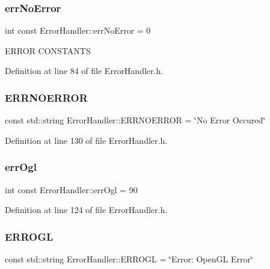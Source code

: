 \subsubsection{\texorpdfstring{errNoError}{errNoError}}
{\footnotesize\ttfamily int const Error\+Handler\+::err\+No\+Error = 0\hspace{0.3cm}{\ttfamily [static]}}

E\+R\+R\+OR C\+O\+N\+S\+T\+A\+N\+TS 

Definition at line 84 of file Error\+Handler.\+h.

\mbox{\label{classErrorHandler_ae805d5476c00a9687c15183268d4e2dd}} 
\subsubsection{\texorpdfstring{ERRNOERROR}{ERRNOERROR}}
{\footnotesize\ttfamily const std\+::string Error\+Handler\+::\+E\+R\+R\+N\+O\+E\+R\+R\+OR = \char`\"{}No Error Occured\char`\"{}\hspace{0.3cm}{\ttfamily [static]}}



Definition at line 130 of file Error\+Handler.\+h.

\mbox{\label{classErrorHandler_aabb7a10334f0e7042faf095dbb185669}} 
\subsubsection{\texorpdfstring{errOgl}{errOgl}}
{\footnotesize\ttfamily int const Error\+Handler\+::err\+Ogl = 90\hspace{0.3cm}{\ttfamily [static]}}



Definition at line 124 of file Error\+Handler.\+h.

\mbox{\label{classErrorHandler_ae3d9cd71ebd01927c4528c2d8bbc5229}} 
\subsubsection{\texorpdfstring{ERROGL}{ERROGL}}
{\footnotesize\ttfamily const std\+::string Error\+Handler\+::\+E\+R\+R\+O\+GL = \char`\"{}Error\+: Open\+GL Error\char`\"{}\hspace{0.3cm}{\ttfamily [static]}}




